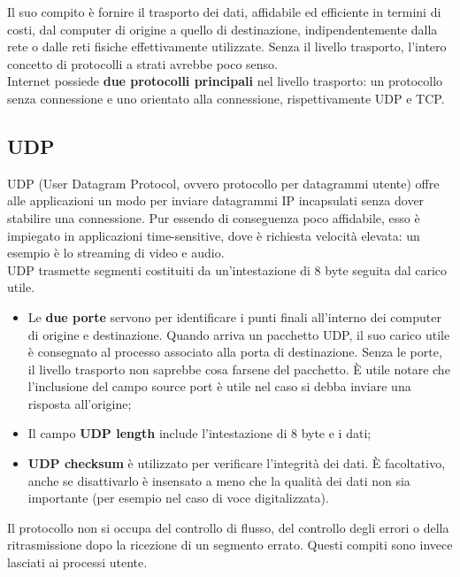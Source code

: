 \documentclass{article}
\begin{document}
    Il suo compito è fornire il trasporto dei dati, affidabile ed efficiente in termini di costi, dal
    computer di origine a quello di destinazione, indipendentemente dalla rete o dalle reti fisiche
    effettivamente utilizzate. Senza il livello trasporto, l’intero concetto di protocolli a strati
    avrebbe poco senso.\\
    
    Internet possiede \textbf{due protocolli principali} nel livello trasporto: un protocollo senza
    connessione e uno orientato alla connessione, rispettivamente UDP e TCP.
        \subsection{UDP}
        UDP (User Datagram Protocol, ovvero protocollo per datagrammi utente) offre alle
        applicazioni un modo per inviare datagrammi IP incapsulati senza dover stabilire una
        connessione. Pur essendo di conseguenza poco affidabile, esso è impiegato in applicazioni
        time-sensitive, dove è richiesta velocità elevata: un esempio è lo streaming di video e audio.\\
        
        UDP trasmette segmenti costituiti da un’intestazione di 8 byte seguita dal carico utile.
        \begin{itemize}
            \item Le \textbf{due porte} servono per identificare i punti finali all’interno dei computer di origine e
            destinazione. Quando arriva un pacchetto UDP, il suo carico utile è consegnato al
            processo associato alla porta di destinazione. Senza le porte, il livello trasporto non
            saprebbe cosa farsene del pacchetto. È utile notare che l’inclusione del campo source
            port è utile nel caso si debba inviare una risposta all’origine;
            \item Il campo \textbf{UDP length} include l’intestazione di 8 byte e i dati;
            \item \textbf{UDP checksum} è utilizzato per verificare l’integrità dei dati. È facoltativo, anche se
            disattivarlo è insensato a meno che la qualità dei dati non sia importante (per esempio
            nel caso di voce digitalizzata).
            
        \end{itemize}
        Il protocollo non si occupa del controllo di flusso, del controllo degli errori o della
        ritrasmissione dopo la ricezione di un segmento errato. Questi compiti sono invece lasciati ai
        processi utente.\\
\end{document}
